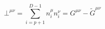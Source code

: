 \begin{equation}
\bot^{\mu\nu}=\sum\limits_{i=p+1}^{D-1}n^\mu_i
n^\nu_i=G^{\mu\nu}-\tilde G^{\mu\nu}
\end{equation}

